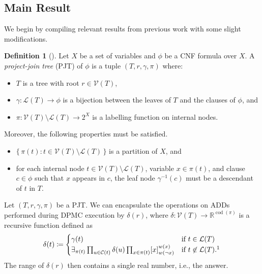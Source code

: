 \documentclass{article}
\theoremstyle{definition}
\newtheorem{definition}{Definition}
\theoremstyle{remark}
\DeclareMathOperator{\cod}{cod}
\begin{document}
\subsection{Main Result}

We begin by compiling relevant results from previous work with some slight
modifications.

\begin{definition}[\cite{DBLP:conf/cp/DudekPV20}]
  Let $X$ be a set of variables and $\phi$ be a CNF formula over $X$. A
  \emph{project-join tree} (PJT) of $\phi$ is a tuple $(T, r, \gamma, \pi)$
  where:
  \begin{itemize}
  \item $T$ is a tree with root $r \in \mathcal{V}(T)$,
  \item $\gamma\colon \mathcal{L}(T) \to \phi$ is a bijection between the leaves of
    $T$ and the clauses of $\phi$, and
  \item $\pi\colon \mathcal{V}(T) \setminus \mathcal{L}(T) \to 2^X$ is a
    labelling function on internal nodes.
  \end{itemize}
  Moreover, the following properties must be satisfied.
  \begin{itemize}
  \item $\{\,\pi(t) : t \in \mathcal{V}(T) \setminus \mathcal{L}(T)\,\}$ is a
    partition of $X$, and
  \item for each internal node $t \in \mathcal{V}(T) \setminus \mathcal{L}(T)$,
    variable $x \in \pi(t)$, and clause $c \in \phi$ such that $x$ appears in
    $c$, the leaf node $\gamma^{-1}(c)$ must be a descendant of $t$ in $T$.
  \end{itemize}
\end{definition}

Let $(T, r, \gamma, \pi)$ be a PJT. We can encapsulate the operations on ADDs
performed during \textsc{DPMC} \cite{DBLP:conf/cp/DudekPV20} execution by
$\delta(r)$, where $\delta\colon \mathcal{V}(T) \to \mathbb{R}^{\cod(\pi)}$ is a
recursive function defined as
\begin{equation} \label{eq:execution}
  \delta(t) \coloneqq
  \begin{cases}
    \gamma(t) & \text{if } t \in \mathcal{L}(T) \\
    \exists_{\pi(t)} \prod_{u \in \mathcal{C}(t)} \delta(u) \prod_{x \in \pi(t)} [x]_{w(\neg x)}^{w(x)} & \text{if } t \not\in \mathcal{L}(T) \text{.\footnotemark}
  \end{cases}
\end{equation} 
The range of $\delta(r)$ then contains a single real number, i.e., the answer.
\end{document}
